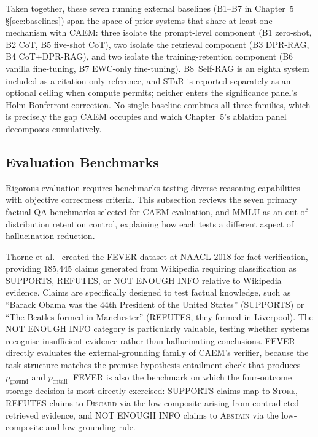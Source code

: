 Taken together, these seven running external baselines (B1--B7 in Chapter~5 §\ref{sec:baselines}) span the space of prior systems that share at least one mechanism with CAEM: three isolate the prompt-level component (B1 zero-shot, B2 CoT, B5 five-shot CoT), two isolate the retrieval component (B3 DPR-RAG, B4 CoT$+$DPR-RAG), and two isolate the training-retention component (B6 vanilla fine-tuning, B7 EWC-only fine-tuning). B8~Self-RAG is an eighth system included as a citation-only reference, and STaR is reported separately as an optional ceiling when compute permits; neither enters the significance panel's Holm-Bonferroni correction. No single baseline combines all three families, which is precisely the gap CAEM occupies and which Chapter~5's ablation panel decomposes cumulatively.

\subsection{Evaluation Benchmarks}

Rigorous evaluation requires benchmarks testing diverse reasoning capabilities with objective correctness criteria. This subsection reviews the seven primary factual-QA benchmarks selected for CAEM evaluation, and MMLU as an out-of-distribution retention control, explaining how each tests a different aspect of hallucination reduction.

Thorne et al.~\cite{thorne-etal-2018-fever} created the FEVER dataset at NAACL 2018 for fact verification, providing 185{,}445 claims generated from Wikipedia requiring classification as SUPPORTS, REFUTES, or NOT ENOUGH INFO relative to Wikipedia evidence. Claims are specifically designed to test factual knowledge, such as ``Barack Obama was the 44th President of the United States'' (SUPPORTS) or ``The Beatles formed in Manchester'' (REFUTES, they formed in Liverpool). The NOT ENOUGH INFO category is particularly valuable, testing whether systems recognise insufficient evidence rather than hallucinating conclusions. FEVER directly evaluates the external-grounding family of CAEM's verifier, because the task structure matches the premise-hypothesis entailment check that produces $p_{\text{ground}}$ and $p_{\text{entail}}$. FEVER is also the benchmark on which the four-outcome storage decision is most directly exercised: SUPPORTS claims map to \textsc{Store}, REFUTES claims to \textsc{Discard} via the low composite arising from contradicted retrieved evidence, and NOT ENOUGH INFO claims to \textsc{Abstain} via the low-composite-and-low-grounding rule.

